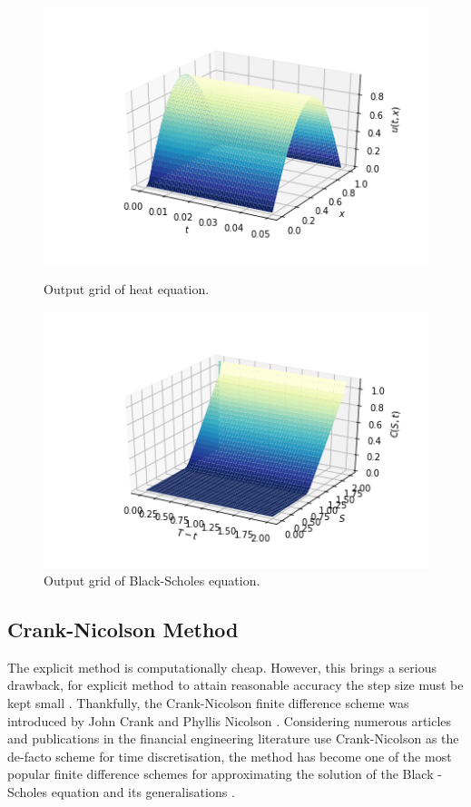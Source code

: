 \documentclass[12pt, oneside]{book}
\theoremstyle{plain}
\theoremstyle{definition}
\begin{document}
\begin{figure}[!htb]
  \begin{minipage}[b]{0.5\textwidth}
    \includegraphics[width=\textwidth]{HeatExplicitGrid.png}
    \caption{Output grid of heat equation.}
  \end{minipage}
  \begin{minipage}[b]{0.5\textwidth}
    \includegraphics[width=\textwidth]{BSExplicitGrid.png}
    \caption{Output grid of Black-Scholes equation.}
  \end{minipage}
\end{figure}

\subsection{Crank-Nicolson Method}
The explicit method is computationally cheap. However, this brings a serious drawback, for explicit method to attain reasonable accuracy the step size must be kept small \cite{gdsmith}. Thankfully, the Crank-Nicolson finite difference scheme was introduced by John Crank and Phyllis Nicolson \cite{cn}. Considering numerous articles and publications in the financial engineering literature use Crank-Nicolson as the de-facto scheme for time discretisation, the method has become one of the most popular finite difference schemes for approximating the solution of the Black - Scholes equation and its generalisations \cite{tavella}.
\end{document}
